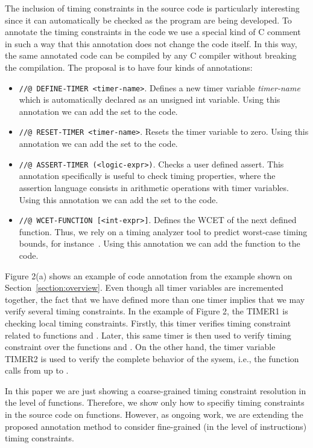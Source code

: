 \documentclass{llncs}
\begin{document}
The inclusion of timing constraints in the source code is particularly interesting since it can automatically be checked as the 
program are being developed. 
To annotate the timing constraints in the code we use a special kind of C comment in such a way that this annotation does not change 
the code itself. 
In this way, the same annotated code can be compiled by any C compiler without breaking the compilation. 
The proposal is to have four kinds of annotations:
\begin{itemize}
 \item {\tt //@ DEFINE-TIMER <timer-name>}. Defines a new timer variable 
   \emph{timer-name} which is automatically declared as an unsigned int variable.
    Using this annotation we can add the set  to the code.
 \item {\tt //@ RESET-TIMER <timer-name>}. Resets the timer variable to zero. 
    Using this annotation we can add the set  to the code.
 \item {\tt //@ ASSERT-TIMER (<logic-expr>)}. Checks a user defined assert. 
  This annotation specifically is useful to check timing properties, 
where the assertion language consists in arithmetic operations with timer variables.
    Using this annotation we can add the set  to the code.
 \item {\tt //@ WCET-FUNCTION [<int-expr>]}. Defines the WCET of the next defined function. 
  Thus, we rely on a timing analyzer tool to predict worst-case timing bounds, for instance~\cite{Bygde09}.
    Using this annotation we can add the function  to the code.
\end{itemize}
Figure 2(a) shows an example of code annotation from the example shown 
on Section~\ref{section:overview}.
Even though all timer variables are incremented together, the fact that we have defined more than one timer
implies that we may verify several timing constraints. 
In the example of Figure 2, the TIMER1 is checking local timing constraints.
Firstly, this timer verifies timing constraint related to functions  and . 
Later, this same timer is then used to verify timing constraint over the functions  and . 
On the other hand, the timer variable TIMER2 is used to verify the complete behavior of the sysem, i.e.,
the function calls from  up to .

In this paper we are just showing a coarse-grained timing constraint resolution in the level of functions. 
Therefore, we show only how to specifiy timing constraints in the source code on functions. 
However, as ongoing work, we are extending the proposed annotation method to consider fine-grained 
(in the level of instructions) timing constraints.
\end{document}
